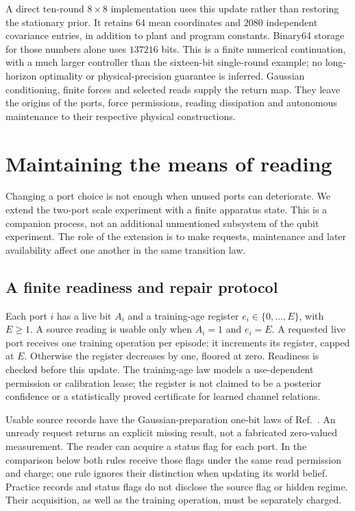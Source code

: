 \documentclass[11pt,a4paper]{article}
\begin{document}
A direct ten-round $8\times8$ implementation uses this update rather
than restoring the stationary prior. It retains $64$ mean coordinates
and $2080$ independent covariance entries, in addition to plant and
program constants. Binary64 storage for those numbers alone uses
$137216$ bits. This is a finite numerical continuation, with a much
larger controller than the sixteen-bit single-round example; no
long-horizon optimality or physical-precision guarantee is inferred.
Gaussian conditioning, finite forces and selected reads supply the
return map. They leave the origins of the ports, force permissions,
reading dissipation and autonomous maintenance to their respective
physical constructions.

\section{Maintaining the means of reading}\label{sec:access-maintenance}

Changing a port choice is not enough when unused ports can deteriorate.
We extend the two-port scale experiment with a finite apparatus state.
This is a companion process, not an additional unmentioned subsystem
of the qubit experiment. The role of the extension is to make requests,
maintenance and later availability affect one another in the same
transition law.

\subsection{A finite readiness and repair protocol}

Each port $i$ has a live bit $A_i$ and a training-age register
$e_i\in\{0,\ldots,E\}$, with $E\geq1$. A source reading is usable
only when $A_i=1$ and $e_i=E$. A requested live port receives one
training operation per episode; it increments its register, capped
at $E$. Otherwise the register decreases by one, floored at zero.
Readiness is checked before this update. The training-age law models
a use-dependent permission or calibration lease; the register is not
claimed to be a posterior confidence or a statistically proved
certificate for learned channel relations.

Usable source records have the Gaussian-preparation one-bit laws of
Ref.~\cite{ImprintRG}. An unready request returns an explicit missing
result, not a fabricated zero-valued measurement. The reader can
acquire a status flag for each port. In the comparison below both
rules receive those flags under the same read permission and charge;
one rule ignores their distinction when updating its world belief.
Practice records and status flags do not disclose the source flag or
hidden regime. Their acquisition, as well as the training operation,
must be separately charged.
\end{document}
